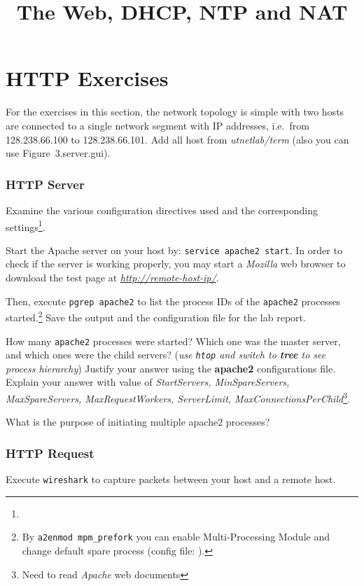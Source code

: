 \documentclass{../UTNetLab}
\title{The Web, DHCP, NTP and NAT}
\begin{document}
\part{HTTP Exercises}
    For the exercises in this section, the network topology is simple with two hosts are connected to a single network segment with IP addresses, i.e.\  from 128.238.66.100 to 128.238.66.101.
    Add all host from \textit{utnetlab/term} (also you can use {Figure~3.server.gui}).

\section{HTTP Server}
    Examine the various configuration directives used and the corresponding settings\footnote{}.

    Start the Apache server on your host by: \lstinline{service apache2 start}.
    In order to check if the server is working properly, you may start a \textit{Mozilla} web browser to download the test page at \href{http://remote-host-ip/}{\textit{http://remote-host-ip/}}.

    Then, execute \lstinline{pgrep apache2} to list the process IDs of the \lstinline{apache2} processes started.\footnote{By \lstinline{a2enmod mpm_prefork} you can enable Multi-Processing Module and change default spare process (config file: ).}
    Save the output and the configuration file for the lab report.
    
    \begin{report}
        \item How many \lstinline{apache2} processes were started?
            Which one was the master server, and which ones were the child servers? (\textit{use \lstinline{htop} and switch to \textbf{tree} to see process hierarchy})
            Justify your answer using the \textbf{apache2} configurations file.
            Explain your answer with value of \textit{StartServers, MinSpareServers, MaxSpareServers, MaxRequestWorkers, ServerLimit, MaxConnectionsPerChild}\footnote{Need to read \textit{Apache} web documents}.
        
        \item What is the purpose of initiating multiple apache2 processes?
    \end{report}

\section{HTTP Request}
    Execute \lstinline{wireshark} to capture packets between your host and a remote host.
\end{document}
